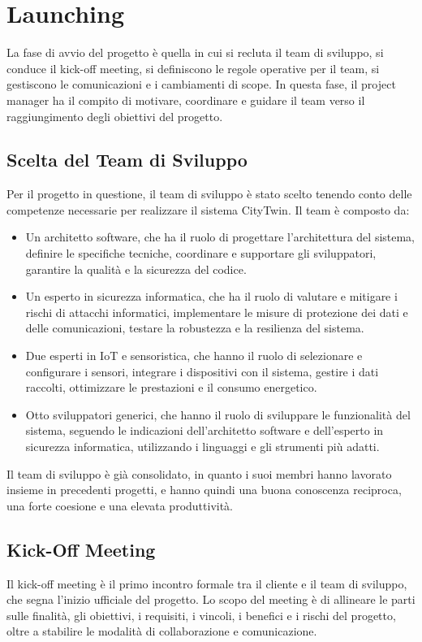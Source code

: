 \chapter{Launching}
La fase di avvio del progetto è quella in cui si recluta il team di sviluppo, si conduce il kick-off meeting, si definiscono le regole operative per il team, si gestiscono le comunicazioni e i cambiamenti di scope. In questa fase, il project manager ha il compito di motivare, coordinare e guidare il team verso il raggiungimento degli obiettivi del progetto.

\section{Scelta del Team di Sviluppo}
Per il progetto in questione, il team di sviluppo è stato scelto tenendo conto delle competenze necessarie per realizzare il sistema CityTwin. Il team è composto da:

\begin{itemize}
    \item Un architetto software, che ha il ruolo di progettare l’architettura del sistema, definire le specifiche tecniche, coordinare e supportare gli sviluppatori, garantire la qualità e la sicurezza del codice.
    \item Un esperto in sicurezza informatica, che ha il ruolo di valutare e mitigare i rischi di attacchi informatici, implementare le misure di protezione dei dati e delle comunicazioni, testare la robustezza e la resilienza del sistema.
    \item Due esperti in IoT e sensoristica, che hanno il ruolo di selezionare e configurare i sensori, integrare i dispositivi con il sistema, gestire i dati raccolti, ottimizzare le prestazioni e il consumo energetico.
    \item Otto sviluppatori generici, che hanno il ruolo di sviluppare le funzionalità del sistema, seguendo le indicazioni dell'architetto software e dell'esperto in sicurezza informatica, utilizzando i linguaggi e gli strumenti più adatti.
\end{itemize}

Il team di sviluppo è già consolidato, in quanto i suoi membri hanno lavorato insieme in precedenti progetti, e hanno quindi una buona conoscenza reciproca, una forte coesione e una elevata produttività.

\section{Kick-Off Meeting}
Il kick-off meeting è il primo incontro formale tra il cliente e il team di sviluppo, che segna l'inizio ufficiale del progetto. Lo scopo del meeting è di allineare le parti sulle finalità, gli obiettivi, i requisiti, i vincoli, i benefici e i rischi del progetto, oltre a stabilire le modalità di collaborazione e comunicazione.

